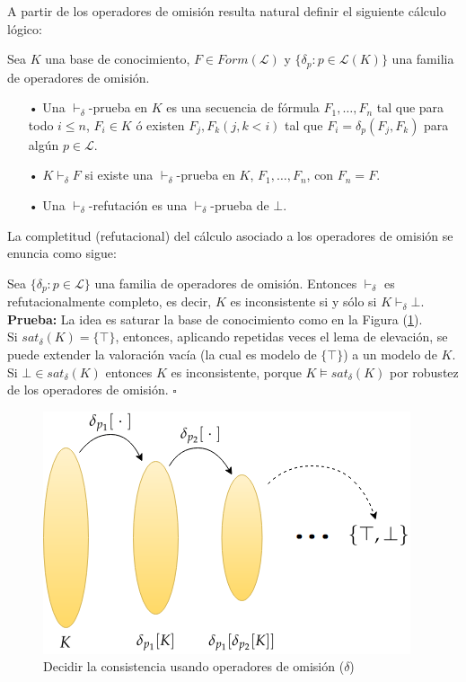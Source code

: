 A partir de los operadores de omisión resulta natural definir el siguiente cálculo lógico:

 \label{def:prueba} Sea $K$ una base de conocimiento, $F\in Form(\mathcal{L})$ y $\{ \delta_p : p \in \mathcal{L}(K) \}$ una familia de operadores de omisión.
\begin{itemize}
\item[•]Una  $\vdash_{\delta}$-prueba en $K$ es una secuencia de fórmula $F_1, \dots ,F_n$ tal que para todo $i \leq n$, $F_i \in K$ ó existen $F_j , F_k (j,k < i)$ tal que $F_i = \delta_p (F_j , F_k)$ para algún $p \in \mathcal{L}$.
\item[•] $K \vdash_{\delta} F$ si existe una $\vdash_{\delta}$-prueba en $K$, $F_1, \dots ,F_n$, con $F_n = F$.
\item[•] Una $\vdash_{\delta}$-refutación es una $\vdash_{\delta}$-prueba de $\bot$.
\end{itemize}

La completitud (refutacional) del cálculo asociado a los operadores de omisión se enuncia como sigue:

\thm \label{teo:completo} Sea $\{ \delta_p : p \in \mathcal{L} \}$ una familia de operadores de omisión. Entonces $\vdash_{\delta}$ es refutacionalmente completo, es decir, $K$ es inconsistente si y sólo si $K \vdash_{\delta} \bot$.\\

\noindent \textbf{Prueba:} La idea es saturar la base de conocimiento como en la Figura (\ref{fig:comple}). \\ 
Si $sat_{\delta} (K) = \{ \top \}$, entonces, aplicando repetidas veces el lema de elevación, se puede extender la valoración vacía (la cual es modelo de $\{ \top \}$) a un modelo de $K$.\\
Si $\bot \in sat_{\delta} (K)$ entonces $K$ es inconsistente, porque $K \vDash sat_{\delta} (K)$ por robustez de los operadores de omisión. $\square$ %

\vspace{0.5cm}
\begin{figure}[h]
	\centering
		\includegraphics[scale=0.8]{imagenes/comple.png}
	\caption{Decidir la consistencia usando operadores de omisión ($\delta$)}
	\label{fig:comple}
\end{figure}
\vspace{0.5cm}

